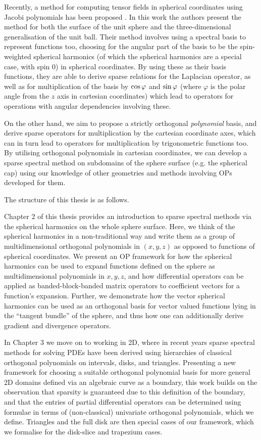 Recently, a method for computing tensor fields in spherical coordinates using Jacobi polynomials has been proposed \cite{vasil2019tensor}. In this work the authors present the method for both the surface of the unit sphere and the three-dimensional generalisation of the unit ball. Their method involves using a spectral basis to represent functions too, choosing for the angular part of the basis to be the spin-weighted spherical harmonics (of which the spherical harmonics are a special case, with spin $0$) in spherical coordinates. By using these as their basis functions, they are able to derive sparse relations for the Laplacian operator, as well as for multiplication of the basis by $\cos\varphi$ and $\sin\varphi$ (where $\varphi$ is the polar angle from the $z$ axis in cartesian coordinates) which lead to operators for operations with angular dependencies involving these. 

On the other hand, we aim to propose a strictly orthogonal \textit{polynomial} basis, and derive sparse operators for multiplication by the cartesian coordinate axes, which can in turn lead to operators for multiplication by trigonometric functions too. By utilising orthogonal polynomials in cartesian coordinates, we can develop a sparse spectral method on subdomains of the sphere surface (e.g. the spherical cap) using our knowledge of other geometries and methods involving OPs developed for them.

The structure of this thesis is as follows.

Chapter 2 of this thesis provides an introduction to sparse spectral methods via the spherical harmonics on the whole sphere surface. Here, we think of the spherical harmonics in a non-traditional way and write them as a group of multidimensional orthogonal polynomials in $(x,y,z)$ as opposed to functions of spherical coordinates. We present an OP framework for how the spherical harmonics can be used to expand functions defined on the sphere as multidimensional polynomials in $x, y, z$, and how differential operators can be applied as banded-block-banded matrix operators to coefficient vectors for a function's expansion. Further, we demonstrate how the vector spherical harmonics can be used as an orthogonal basis for vector valued functions lying in the \enquote{tangent bundle} of the sphere, and thus how one can additionally derive gradient and divergence operators.

In Chapter 3 we move on to working in 2D, where in recent years sparse spectral methods for solving PDEs have been derived using hierarchies of classical orthogonal polynomials on intervals, disks, and triangles. Presenting a new framework for choosing a suitable orthogonal polynomial basis for more general 2D domains defined via an algebraic curve as a boundary, this work builds on the observation that sparsity is guaranteed due to this definition of the boundary, and that the entries of partial differential operators can be determined using formulae in terms of (non-classical) univariate orthogonal polynomials, which we define. Triangles and the full disk are then special cases of our framework, which we formalise for the disk-slice and trapezium cases.

